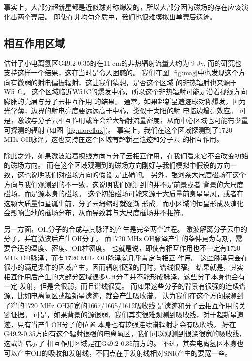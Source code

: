 事实上，大部分超新星都是近似球对称爆发的，所以大部分因为磁场的存在应该演化出两个壳层。
即使在非均匀介质中，我们也很难模拟出单壳层遗迹。

\subsection{相互作用区域}
\citet{1994JKAS...27...81M}估计了小电离氢区G49.2-0.35的在11 cm的非热辐射流量大约为
9 Jy, 而\citet{Brogan2013}的研究也支持这样一个结果，这在当时是令人困惑的。
我们在图~\ref{fig:mag}中也发现这个方向有微弱的射电偏振辐射，这让我们猜想，是否这个区域
的非热辐射也来源于W51C。
这个区域临近W51C的爆发中心，所以这个非热辐射可能是沿着视线方向膨胀的壳层与分子云相互作用
的结果。
通常，如果超新星遗迹球对称爆发，因为光学薄，边界的射电亮度要远远高于中心，类似于太阳的射
电临边增亮效应。
可是，激波与分子云相互作用或许会增大辐射流量密度，从而中心区域也可能有少量可探测的辐射
(如图~\ref{fig:moreflux})。
事实上，我们在这个区域探测到了1720 MHz OH脉泽，这也支持在这个区域有超新星遗迹和分子云
的相互作用。

除此之外，如果激波沿着视线方向与分子云相互作用，在我们看来它不会改变初始的磁场方向。
而在这个区域观测到的磁场方向刚好与我们模拟中假设的方向一致，这也说明我们对磁场方向的假设
是正确的。
另外，银河系大尺度磁场在这个方向与我们观测到的不一致，这说明我们观测到的并不是前景或者
背景的大尺度磁场，而是源本身的磁场。
这个初始磁场可能来源于大质量前身星星风，或者在这颗大质量恒星诞生前，分子云坍缩时就逐渐
形成，而小区域的恒星形成及演化会影响当地的磁场分布，从而导致其与大尺度磁场并不相符。

另一方面，OH分子的合成与其脉泽的产生是完全两个过程。
激波解离分子云中的分子，并在激波后产生OH分子。
而1720 MHz OH脉泽产生的条件更为苛刻，需要合适的温度、密度、OH柱密度。
也就是说，即使有相互作用也不一定有1720 MHz OH脉泽，而有1720 MHz OH脉泽就几乎肯定有相互
作用。
这些脉泽只会在很小的满足条件的区域产生，因而辐射很强的同时，谱线很窄。
结果就是，其实相互作用后产生的大部分区域很多OH分子并不能形成脉泽，这些分子本身也会有一定
发射，但是会很弱，而且谱线很宽。
而如果这些分子的背景有很强的连续谱源，比如电离氢区或超新星遗迹，就会产生吸收谱。
\citet{Hewitt2008}认为我们在这个方向探测到了窄的1720 MHz OH和宽的1667/1665/1612吸收线
是遗迹和分子云相互作用的关键证据。
可是，如果背景的源很弱，我们其实很难观测到吸收线，对于超新星遗迹，只有当产生OH分子的位置
本身也有较强连续谱辐射才会有吸收线。
好在G49.2-0.35方向有这个辐射很强的电离氢区，我们可以观测到很深很宽的吸收线，这或许暗示了
相互作用区域是在G49.2-0.35前方的。
不过，其实电离氢区本身也可以产生OH的吸收和发射线，不同点在于发射线相对SNR产生的要宽一些。

